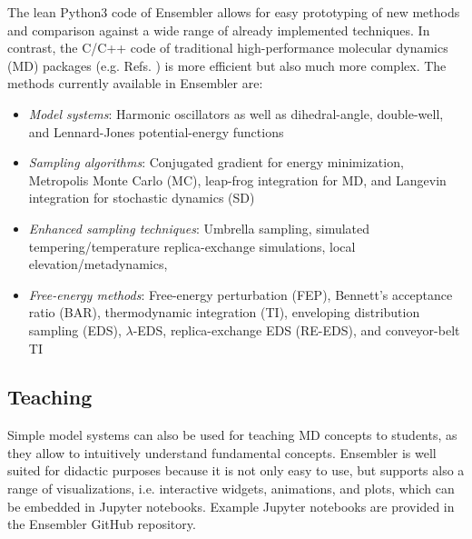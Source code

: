 The lean Python3 code\cite{Vanrossum2009} of Ensembler allows for easy prototyping of new methods and comparison against a wide range of already implemented techniques. 
In contrast, the C/C++\cite{Stroustrup1995} code of traditional high-performance molecular dynamics (MD) packages (e.g. Refs. ) is more efficient but also much more complex. 
%
The methods currently available in Ensembler are:
\begin{itemize}
	\item \textit{Model systems}: Harmonic oscillators as well as dihedral-angle, double-well, and Lennard-Jones potential-energy functions\cite{Jones1924}
	\item \textit{Sampling algorithms}: Conjugated gradient\cite{Hestenes1952} for energy minimization, Metropolis Monte Carlo (MC),\cite{Hastings1970} leap-frog integration\cite{Vangunsteren1988} for MD, and Langevin integration\cite{Brunger1984} for stochastic dynamics (SD)
	\item \textit{Enhanced sampling techniques}: Umbrella sampling,\cite{Valleau1977} simulated tempering/temperature replica-exchange simulations,\cite{Sugita1999} local elevation/metadynamics,\cite{Huber1994, Laio2002}
	\item \textit{Free-energy methods}: Free-energy perturbation (FEP),\cite{Zwanzig1954} Bennett's acceptance ratio (BAR),\cite{Bennett1976} thermodynamic integration (TI),\cite{Kirkwood1935} enveloping distribution sampling (EDS),\cite{Christ2007, Christ2008, Christ2009} $\lambda$-EDS,\cite{Koenig2020} replica-exchange EDS (RE-EDS),\cite{Sidler2016} and conveyor-belt TI\cite{Hahn2019}
\end{itemize}

\subsection{Teaching}

Simple model systems can also be used for teaching MD concepts to students, as they allow to intuitively understand fundamental concepts. \cite{Pohorille2010} 
Ensembler is well suited for didactic purposes because it is not only easy to use, but supports also a range of visualizations, i.e. interactive widgets, animations, and plots, which can be embedded in Jupyter notebooks.\cite{Kluyver2016}
Example Jupyter notebooks\cite{Kluyver2016} are provided in the Ensembler GitHub repository.